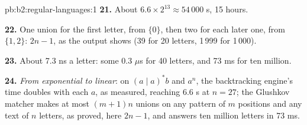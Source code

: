 \begin{solution}{pb:b2:regular-languages:1}
\textbf{21.} About $6.6 \times 2^{13} \approx 54\,000$ s, 15 hours.

\textbf{22.} One union for the first letter, from $\{0\}$, then two for each later one, from $\{1, 2\}$: $2n - 1$, as
the output shows (39 for 20 letters, 1\,999 for 1\,000).

\textbf{23.} About 7.3 ns a letter: some 0.3 $\mu$s for 40 letters, and 73 ms for ten million.

\textbf{24.} \emph{From exponential to linear}: on $(a \mid a)^*b$ and $a^n$, the backtracking engine's time doubles
with each $a$, as measured, reaching 6.6 s at $n = 27$; the Glushkov matcher makes at most $(m + 1)n$ unions on any
pattern of $m$ positions and any text of $n$ letters, as proved, here $2n - 1$, and answers ten million letters in
73 ms.
\end{solution}
